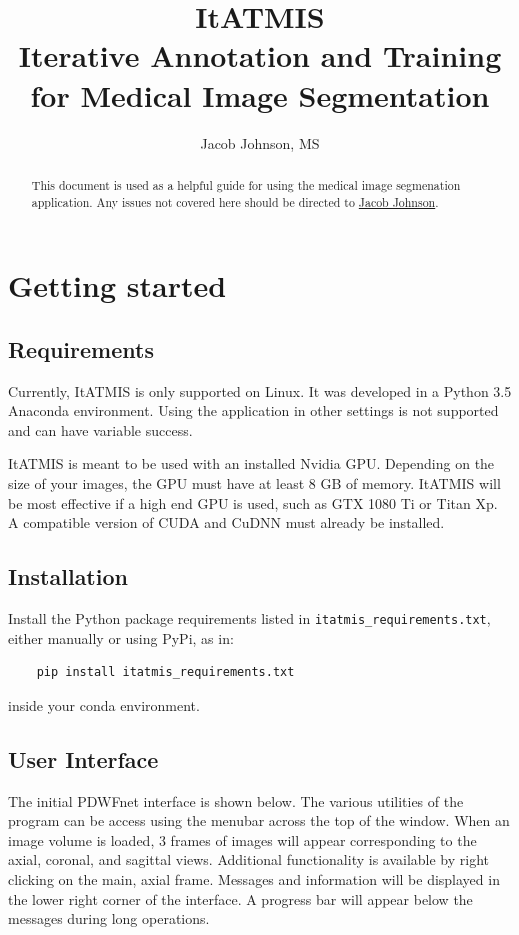 \documentclass[twoside,a4paper]{refart}
\title{ItATMIS \\ Iterative Annotation and Training for Medical Image Segmentation}
\author{Jacob Johnson, MS}
\date{}
\begin{document}
\maketitle

\begin{abstract}
        This document is used as a helpful guide for using the medical image segmenation application. Any issues not covered here should be directed to \href{mailto:jmjohnson33@wisc.edu}{Jacob Johnson}.
\end{abstract}

\tableofcontents

\newpage


\section{Getting started}
\subsection{Requirements}
Currently, ItATMIS is only supported on Linux. It was developed in a Python 3.5 Anaconda environment. Using the application in other settings is not supported and can have variable success.

ItATMIS is meant to be used with an installed Nvidia GPU. Depending on the size of your images, the GPU must have at least 8 GB of memory. ItATMIS will be most effective if a high end GPU is used, such as GTX 1080 Ti or Titan Xp. A compatible version of CUDA and CuDNN must already be installed. 
\subsection{Installation}
Install the Python package requirements listed in \texttt{itatmis_requirements.txt}, either manually or using PyPi, as in:
\begin{verbatim}
	pip install itatmis_requirements.txt
\end{verbatim}
inside your conda environment.

\subsection{User Interface}

The initial PDWFnet interface is shown below. The various utilities of the program can be access using the menubar across the top of the window. When an image volume is loaded, 3 frames of images will appear corresponding to the axial, coronal, and sagittal views. Additional functionality is available by right clicking on the main, axial frame. Messages and information will be displayed in the lower right corner of the interface. A progress bar will appear below the messages during long operations.
\end{document}
